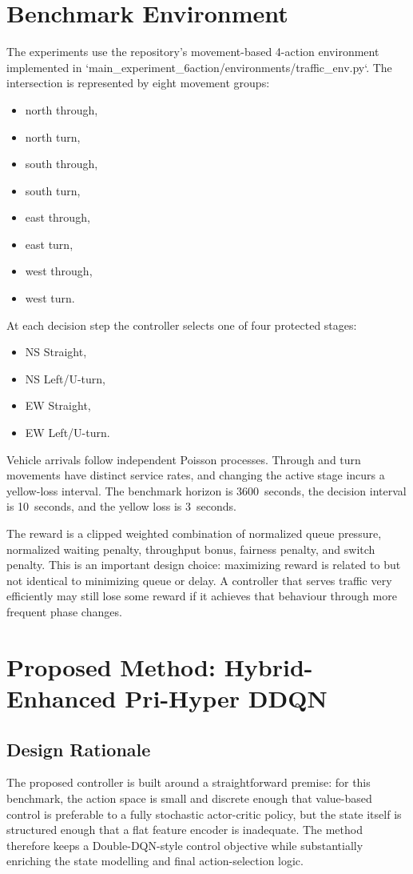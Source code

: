 \documentclass[conference]{IEEEtran}
\begin{document}
\section{Benchmark Environment}
The experiments use the repository's movement-based 4-action
environment implemented in
`main\_experiment\_6action/environments/traffic\_env.py`. The
intersection is represented by eight movement groups:

\begin{itemize}
\item north through,
\item north turn,
\item south through,
\item south turn,
\item east through,
\item east turn,
\item west through,
\item west turn.
\end{itemize}

At each decision step the controller selects one of four protected
stages:

\begin{itemize}
\item NS Straight,
\item NS Left/U-turn,
\item EW Straight,
\item EW Left/U-turn.
\end{itemize}

Vehicle arrivals follow independent Poisson processes. Through and
turn movements have distinct service rates, and changing the active
stage incurs a yellow-loss interval. The benchmark horizon is
3600~seconds, the decision interval is 10~seconds, and the yellow
loss is 3~seconds.

The reward is a clipped weighted combination of normalized queue
pressure, normalized waiting penalty, throughput bonus, fairness
penalty, and switch penalty. This is an important design choice:
maximizing reward is related to but not identical to minimizing queue
or delay. A controller that serves traffic very efficiently may still
lose some reward if it achieves that behaviour through more frequent
phase changes.

\section{Proposed Method: Hybrid-Enhanced Pri-Hyper DDQN}
\subsection{Design Rationale}
The proposed controller is built around a straightforward premise:
for this benchmark, the action space is small and discrete enough
that value-based control is preferable to a fully stochastic
actor-critic policy, but the state itself is structured enough that a
flat feature encoder is inadequate. The method therefore keeps a
Double-DQN-style control objective while substantially enriching the
state modelling and final action-selection logic.
\end{document}
